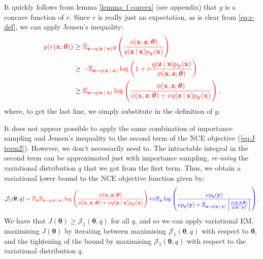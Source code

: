 \documentclass[11pt, oneside]{article}
\newcommand{\thetab}{{\boldsymbol{\theta}}}
\newcommand{\pnn}{\phi}
\newcommand{\pnoise}{p_{ \mathbf y}}
\newcommand{\q}[1]{q(\z \given{#1})}
\newcommand{\x}{{\mathbf x}}
\newcommand{\y}{{\mathbf y}}
\newcommand{\z}{{\mathbf z}}
\newcommand{\E}{\mathbb{E}}
\newcommand{\Ex}{\E_{\x}}
\newcommand{\Ey}{\E_{\y}}
\newcommand{\Evar}[1]{\E_{\z \sim \q{#1}}}
\newcommand{\J}{\mathcal{J}}
\newcommand\given[1][]{\:#1\vert\:}
\theoremstyle{definition}
\begin{document}
It quickly follows from lemma \ref{lemma: f convex} (see appendix) that $g$ is a concave function of $r$. Since $r$ is really just an expectation, as is clear from \ref{eq:r-def}, we can apply Jensen's inequality:
\begin{align}
 \color{red}{g(r(\x; \thetab))}  
    &\geq  \color{red}{\Evar{\x} g \left( \frac{\pnn(\x, \z;\thetab)}{\q{\x}\pnoise(\x)} \right)} \\
    &\geq  \color{red}{-\Evar{\x} \log \left(1+\nu \frac{\q{\x}\pnoise(\x)}{\pnn(\x,\z; \thetab)}\right)}  \\
    &\geq  \color{red}{\Evar{\x} \log \left( \frac{\pnn(\x,\z; \thetab)}{\pnn(\x,\z; \thetab) + \nu\q{\x}\pnoise(\x)} \right),} 
\end{align}
where, to get the last line, we simply substitute in the definition of $g$.

It does not appear possible to apply the same combination of importance sampling and Jensen's inequality to the second term of the NCE objective (\ref{eq:J term2}). However, we don’t necessarily need to. The intractable integral in the second term can be approximated just with importance sampling, \emph{re-using} the variational distribution $q$ that we got from the first term. Thus, we obtain a variational lower bound to the NCE objective function given by:
\begin{equation}
  \J_1(\thetab, q) 
  = \color{red}{\Ex \Evar{\x} \log \left( \frac{\pnn(\x,\z; \thetab)}{\pnn(\x,\z; \thetab) + \nu\q{\x}\pnoise(\x)} \right)}
   \color{blue}{ + \nu \Ey \log \left( \frac{\nu\pnoise(\y)}{\nu\pnoise(\y) + \E_{\z \sim q(\z \given \y)} \left[\frac{\pnn(\y,\z; \thetab)}{q(\z \given \y)} \right]}  \right).}
  \label{eq:vnce objective}
\end{equation}
We have that $J(\thetab) \ge \J_1(\thetab, q)$ for all $q$, and so we can apply variational EM, maximising $J(\thetab)$ by iterating between maximising $\J_1(\thetab,q)$ with respect to $\thetab$, and the tightening of the bound by maximising $\J_1(\thetab,q)$ with respect to the variational distribution $q$.
\end{document}
